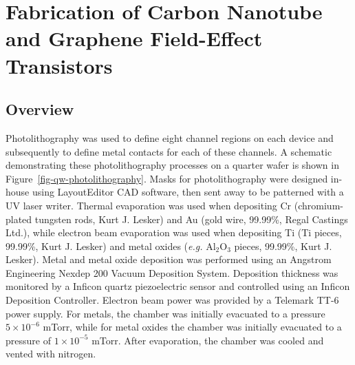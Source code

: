 \documentclass[
  a4paper,
]{scrbook}
\begin{document}
\hypertarget{sec-qw-processing}{%
\section{Fabrication of Carbon Nanotube and Graphene Field-Effect
Transistors}\label{sec-qw-processing}}

\hypertarget{sec-overview-processing}{%
\subsection{Overview}\label{sec-overview-processing}}

Photolithography was used to define eight channel regions on each device
and subsequently to define metal contacts for each of these channels. A
schematic demonstrating these photolithography processes on a quarter
wafer is shown in Figure~\ref{fig-qw-photolithography}. Masks for
photolithography were designed in-house using LayoutEditor CAD software,
then sent away to be patterned with a UV laser writer. Thermal
evaporation was used when depositing Cr (chromium-plated tungsten rods,
Kurt J. Lesker) and Au (gold wire, 99.99\%, Regal Castings Ltd.), while
electron beam evaporation was used when depositing Ti (Ti pieces,
99.99\%, Kurt J. Lesker) and metal oxides (\emph{e.g.} Al\(_2\)O\(_3\)
pieces, 99.99\%, Kurt J. Lesker). Metal and metal oxide deposition was
performed using an Angstrom Engineering Nexdep 200 Vacuum Deposition
System. Deposition thickness was monitored by a Inficon quartz
piezoelectric sensor and controlled using an Inficon Deposition
Controller. Electron beam power was provided by a Telemark TT-6 power
supply. For metals, the chamber was initially evacuated to a pressure
\(5 \times 10^{-6}\) mTorr, while for metal oxides the chamber was
initially evacuated to a pressure of \(1 \times 10^{-5}\) mTorr. After
evaporation, the chamber was cooled and vented with nitrogen.
\end{document}
